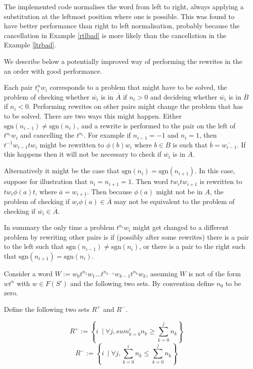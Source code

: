 \documentclass[12pt]{article} %
\theoremstyle{definition}
\theoremstyle{definition}
\theoremstyle{definition}
\theoremstyle{definition}
\begin{document}
The implemented code normalises the word from left to right, always applying
a substitution at the leftmost position where one is possible. This was found to have better
performance than right to left normalisation, probably because the cancellation
in Example \ref{rtlbad} is more likely than the cancellation in the Example \ref{ltrbad}.

We describe below a potentially improved way of performing the rewrites in the
an order with good performance.

Each pair $t^n_iw_i$ corresponds to a problem that might have to be solved, the problem
of checking whether $\overline{w_i}$ is in $\overline{A}$ if $n_i > 0$ and decideing whether
$\overline{w_i}$ is in $\overline{B}$ if $n_i < 0$. Performing rewrites on other pairs
might change the problem that has to be solved. There are two ways this might happen.
Either $\text{sgn}(n_{i-1}) \ne \text{sgn}(n_i)$, and a rewrite is performed
to the pair on the left of $t^{n_i} w_i$ and cancelling the $t^{n_i}$. For example
if $n_{i-1} = -1$ and $n_i = 1$, then $t^{-1}w_{i-1}tw_i$ might be rewritten
to $\phi(b)w_i$ where $b \in B$ is such that $\overline{b} = \overline{w_{i-1}}$.
If this happens then it will not be necessary to check if $\overline{w_i}$ is in
$\overline{A}$.

Alternatively it might be the case that $\text{sgn}(n_i) = \text{sgn}(n_{i+1})$. In this case,
suppose for illustration that $n_i = n_{i+1} = 1$. Then word $tw_itw_{i+1}$ is rewritten
to $tw_i\phi(a)t$, where $\overline{a} = w_{i+1}$. Then because $\phi(a)$ might not be in $A$,
the problem of checking if $\overline{w_i\phi(a)} \in \overline{A}$ may not be equivalent
to the problem of checking if $\overline{w_i} \in \overline{A}$.

In summary the only time a problem $t^{n_i}w_i$ might get changed to a different problem
by rewriting other pairs is if (possibly after some rewrites) there
is a pair to the left such that $\text{sgn}(n_{i-1}) \ne \text{sgn}(n_i)$,
or there is a pair to the right such that $\text{sgn}(n_{i+1}) = \text{sgn}(n_i)$.


Consider a word $W := w_0t^{n_1}w_1 \dots t^{n_{k-1}}w_{k-1}t^{n_k}w_k$, assuming
$W$ is not of the form $wt^n$ with $w \in F(S')$ and the
following two sets. By convention define $n_0$ to be zero.

Define the following two sets $R^+$ and $R^-$.

\begin{equation}
    R^{+} := \left\{ i \ \mid \forall j, sum_{k=0}^i n_k \ge \sum_{k=0}^j n_k\right\}
\end{equation}
\begin{equation}
    R^{-} := \left\{ i \ \mid \forall j, \sum_{k=0}^i n_k \le \sum_{k=0}^j n_k \right\}
\end{equation}
\end{document}
